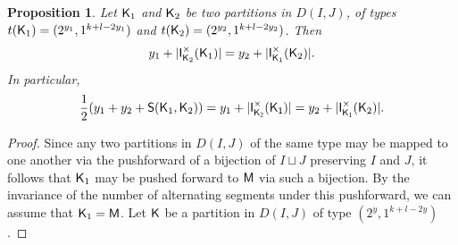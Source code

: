 \documentclass[11pt, a4paper, oneside, reqno]{amsart}
\newcommand{\sK}{{\sf K}}
\newcommand{\setK}{{D(I,J)}}
\newcommand{\sM}{{\sf M}}
\newtheorem{proposition}[theorem]{Proposition}
\theoremstyle{remark}
\theoremstyle{definition}
\numberwithin{equation}{section}
\begin{document}
\begin{proposition}
	\label{prop:SymmetrySegments}
	Let ${\sf K}_1$ and ${\sf K}_2$ be two partitions in $D(I,J)$, of types $t(\sK_1) =(2^{y_1}, 1^{k+l-2y_1})$ and $t(\sK_2) = (2^{y_2}, 1^{k+l-2y_2})$. Then
	\begin{align*}
		y_1  + |{\sf I}^{\times}_{\sK_2} ({\sK_1})| = y_2 + |{\sf I}^{\times}_{\sK_1} ({\sK}_2)|.
	\end{align*}
	In particular,
	\begin{align*}
		\frac{1}{2}(y_1+y_2+{\sf S}({\sf K}_1, {\sf K}_2)) = y_1 + |{\sf I}^{\times}_{\sf K_2} ({\sf K_1})| = y_2 + |{\sf I}^{\times}_{\sf K_1} ({\sf K}_2)|.
	\end{align*}
\end{proposition}
\begin{proof}
    Since any two partitions in $\setK$ of the same type may be mapped to one another via the pushforward of a bijection of $I \sqcup J$ preserving $I$ and $J$, it follows that $\sK_1$ may be pushed forward to $\sM$ via such a bijection. By the invariance of the number of alternating segments under this pushforward, we can assume that $\sK_1 = \sM$.
Let ${\sf K}$ be a partition in $D(I,J)$ of type $(2^y,1^{k+l-2y})$.


\end{proof}
\end{document}
